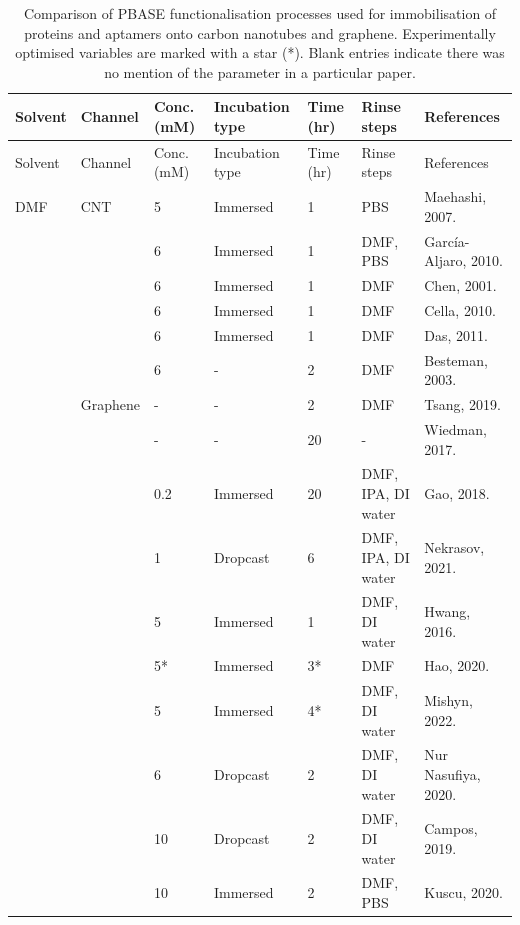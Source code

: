 \documentclass[
  a4paper,
]{scrbook}
\begin{document}
\hypertarget{tbl-pbase-functionalisation}{}
\begin{longtable}[]{@{}lllllll@{}}
\caption{\label{tbl-pbase-functionalisation}Comparison of PBASE
functionalisation processes used for immobilisation of proteins and
aptamers onto carbon nanotubes and graphene. Experimentally optimised
variables are marked with a star (*). Blank entries indicate there was
no mention of the parameter in a particular paper.}\tabularnewline
\toprule\noalign{}
Solvent & Channel & Conc. (mM) & Incubation type & Time (hr) & Rinse
steps & References \\
\midrule\noalign{}
\endfirsthead
\toprule\noalign{}
Solvent & Channel & Conc. (mM) & Incubation type & Time (hr) & Rinse
steps & References \\
\midrule\noalign{}
\endhead
\bottomrule\noalign{}
\endlastfoot
DMF & CNT & 5 & Immersed & 1 & PBS & Maehashi, 2007.
\cite{Maehashi2007} \\
& & 6 & Immersed & 1 & DMF, PBS & García-Aljaro, 2010.
\cite{Garcia-Aljaro2010} \\
& & 6 & Immersed & 1 & DMF & Chen, 2001. \cite{Chen2001} \\
& & 6 & Immersed & 1 & DMF & Cella, 2010. \cite{Cella2010} \\
& & 6 & Immersed & 1 & DMF & Das, 2011. \cite{Das2011} \\
& & 6 & - & 2 & DMF & Besteman, 2003. \cite{Besteman2003} \\
& Graphene & - & - & 2 & DMF & Tsang, 2019. \cite{Tsang2019} \\
& & - & - & 20 & - & Wiedman, 2017. \cite{Wiedman2017} \\
& & 0.2 & Immersed & 20 & DMF, IPA, DI water & Gao, 2018.
\cite{Gao2018} \\
& & 1 & Dropcast & 6 & DMF, IPA, DI water & Nekrasov, 2021.
\cite{Nekrasov2021} \\
& & 5 & Immersed & 1 & DMF, DI water & Hwang, 2016. \cite{Hwang2016} \\
& & 5* & Immersed & 3* & DMF & Hao, 2020. \cite{Hao2020} \\
& & 5 & Immersed & 4* & DMF, DI water & Mishyn, 2022.
\cite{Mishyn2022} \\
& & 6 & Dropcast & 2 & DMF, DI water & Nur Nasufiya, 2020.
\cite{NurNasyifa2020} \\
& & 10 & Dropcast & 2 & DMF, DI water & Campos, 2019.
\cite{Campos2019} \\
& & 10 & Immersed & 2 & DMF, PBS & Kuscu, 2020. \cite{Kuscu2020} \\

\end{longtable}
\end{document}
